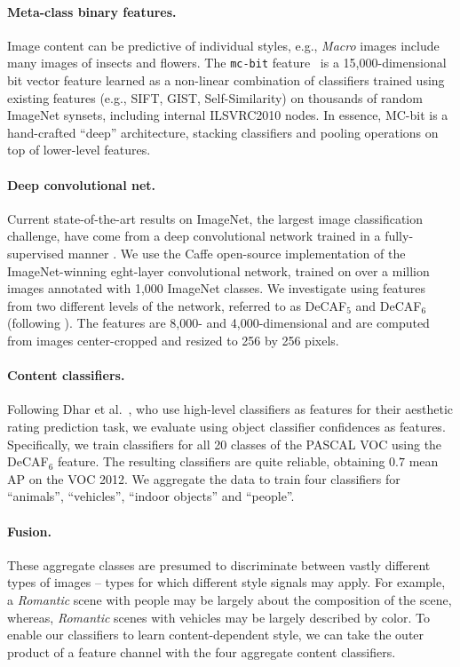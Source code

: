 \paragraph{Meta-class binary features.}
Image content can be predictive of individual styles, e.g., \emph{Macro} images include many images of insects and flowers. The \texttt{mc-bit} feature~\parencite{Bergamo-CVPR-2012} is a 15,000-dimensional bit vector feature learned as a non-linear combination of classifiers trained using existing features (e.g., SIFT, GIST, Self-Similarity) on thousands of random ImageNet synsets, including internal ILSVRC2010 nodes.
In essence, MC-bit is a hand-crafted ``deep'' architecture, stacking classifiers and pooling operations on top of lower-level features.

\paragraph{Deep convolutional net.}
Current state-of-the-art results on ImageNet, the largest image classification challenge, have come from a deep convolutional network trained in a fully-supervised manner \parencite{krizhevsky2012imagenet}.
We use the Caffe \parencite{Jia13caffe} open-source implementation of the ImageNet-winning eght-layer convolutional network, trained on over a million images annotated with 1,000 ImageNet classes.
We investigate using features from two different levels of the network, referred to as DeCAF$_5$ and DeCAF$_6$ (following \parencite{Donahue2013}).
The features are 8,000- and 4,000-dimensional and are computed from images center-cropped and resized to 256 by 256 pixels.

\paragraph{Content classifiers.}
Following Dhar et al.~\parencite{Dhar-CVPR-2011}, who use high-level classifiers as features for their aesthetic rating prediction task, we evaluate using object classifier confidences as features.
Specifically, we train classifiers for all 20 classes of the PASCAL VOC \parencite{pascal-voc-2010} using the DeCAF$_6$ feature.
The resulting classifiers are quite reliable, obtaining $0.7$ mean AP on the VOC 2012.
We aggregate the data to train four classifiers for ``animals'', ``vehicles'', ``indoor objects'' and ``people''.

\paragraph{Fusion.}
These aggregate classes are presumed to discriminate between vastly different types of images -- types for which different style signals may apply.
For example, a \emph{Romantic} scene with people may be largely about the composition of the scene, whereas, \emph{Romantic} scenes with vehicles may be largely described by color.
To enable our classifiers to learn content-dependent style, we can take the outer product of a feature channel with the four aggregate content classifiers.

